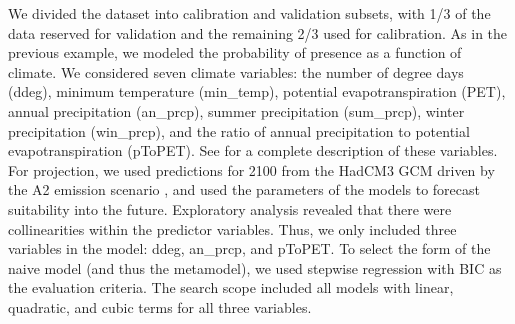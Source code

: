 \documentclass[11pt]{article}
\newcommand{\rev}[1]{{\color{RoyalBlue}#1}}
\begin{document}
We divided the dataset into calibration and validation subsets, with 1/3 of the data reserved for validation and the remaining 2/3 used for calibration.
As in the previous example, we modeled the probability of presence as a function of climate.
We considered seven climate variables: the number of degree days (ddeg), minimum temperature (min\_temp), potential evapotranspiration (PET), annual precipitation (an\_prcp), summer precipitation (sum\_prcp), winter precipitation (win\_prcp), and the ratio of annual precipitation to potential evapotranspiration (pToPET).
See \citet{Morin2009} for a complete description of these variables.
For projection, we used predictions for \rev{2100} from the HadCM3 GCM \citep{Pope2000} driven by the A2 emission scenario \citep{Nakicenovic2000}, and used the parameters of the models to forecast suitability into the future.
Exploratory analysis revealed that there were collinearities within the predictor variables.
Thus, we only included three variables in the model: ddeg, an\_prcp, and pToPET.
To select the form of the naive model (and thus the metamodel), we used stepwise regression with BIC as the evaluation criteria.
The search scope included all models with linear, quadratic, and cubic terms for all three variables.
\end{document}

